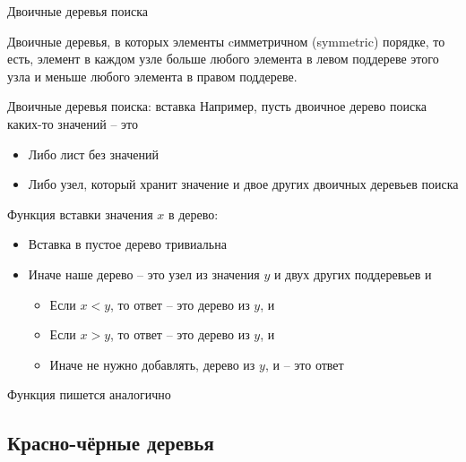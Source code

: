 \begin{frame}{Двоичные деревья поиска}
\begin{definition}
Двоичные деревья, в которых элементы cимметричном
 (symmetric) порядке, то есть, элемент в каждом узле больше любого элемента в левом поддереве
этого узла и меньше любого элемента в правом поддереве. 
\end{definition}
\end{frame}

\begin{frame}{Двоичные деревья поиска: вставка}
Например, пусть двоичное дерево поиска каких-то значений -- это 
\begin{itemize}
\item Либо лист без значений
\item Либо узел, который хранит значение и двое других двоичных деревьев поиска
\end{itemize}
\vspace{1em}

Функция  вставки значения $x$ в дерево:
\begin{itemize}
\item Вставка в пустое дерево тривиальна
\item Иначе наше дерево -- это узел из значения $y$ и двух других поддеревьев  и 
\begin{itemize}
\item Если $x<y$, то ответ -- это дерево из $y$,  и 
\item Если $x>y$, то ответ -- это дерево из $y$,  и  
\item Иначе не нужно добавлять, дерево из $y$,  и  -- это ответ
\end{itemize}
\end{itemize}
\vspace{2em}
Функция  пишется аналогично
\end{frame}

%






\subsection{Красно-чёрные деревья}

